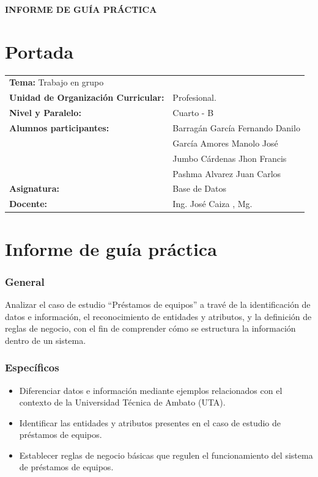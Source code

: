 \documentclass{article}
\begin{document}
\begin{center}
    {\large \textbf{INFORME DE GUÍA PRÁCTICA}} \\    
\end{center}

\section{Portada}
\begin{flushleft}
\begin{tabular}{ l l }
    \textbf{Tema:} Trabajo en grupo &  \\
    \textbf{Unidad de Organización Curricular:} & Profesional. \\
    \textbf{Nivel y Paralelo:} & Cuarto - B \\
    \textbf{Alumnos participantes:} & Barragán García Fernando Danilo \\& García Amores Manolo José\\&Jumbo Cárdenas Jhon Francis \\& Pashma Alvarez Juan Carlos
     \\
    \textbf{Asignatura:} & Base de Datos \\
    \textbf{Docente:} & Ing. José Caiza , Mg. \\
\end{tabular}
\end{flushleft}


\section{Informe de guía práctica}
\subsubsection{General}
Analizar el caso de estudio “Préstamos de equipos” a travé de la identificación de datos e información, el reconocimiento de entidades y atributos, y la definición de reglas de negocio, con el fin de comprender cómo se estructura la información dentro de un sistema.

\subsubsection{Específicos}

\begin{itemize}
    \item Diferenciar datos e información mediante ejemplos relacionados con el contexto de la Universidad Técnica de Ambato (UTA).

    \item Identificar las entidades y atributos presentes en el caso de estudio de préstamos de equipos.

    \item Establecer reglas de negocio básicas que regulen el funcionamiento del sistema de préstamos de equipos.
\end{itemize}
\end{document}
